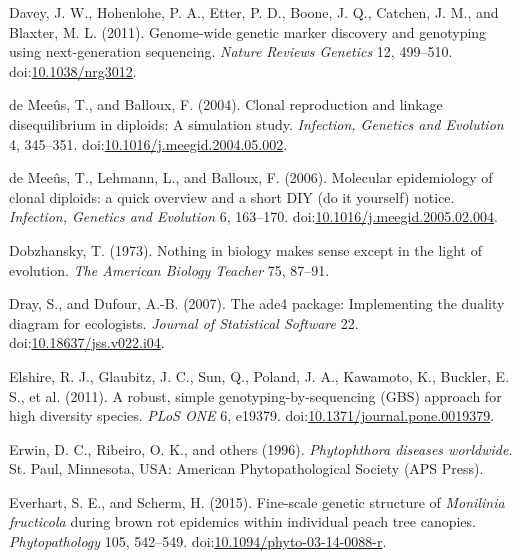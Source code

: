 \documentclass[double,12pt]{beavtex}
\begin{document}
  \hypertarget{ref-davey2011genome}{}
  Davey, J. W., Hohenlohe, P. A., Etter, P. D., Boone, J. Q., Catchen, J.
  M., and Blaxter, M. L. (2011). Genome-wide genetic marker discovery and
  genotyping using next-generation sequencing. \emph{Nature Reviews
  Genetics} 12, 499--510.
  doi:\href{https://doi.org/10.1038/nrg3012}{10.1038/nrg3012}.
  
  \hypertarget{ref-de2004clonal}{}
  de Meeûs, T., and Balloux, F. (2004). Clonal reproduction and linkage
  disequilibrium in diploids: A simulation study. \emph{Infection,
  Genetics and Evolution} 4, 345--351.
  doi:\href{https://doi.org/10.1016/j.meegid.2004.05.002}{10.1016/j.meegid.2004.05.002}.
  
  \hypertarget{ref-de2006molecular}{}
  de Meeûs, T., Lehmann, L., and Balloux, F. (2006). Molecular
  epidemiology of clonal diploids: a quick overview and a short DIY (do it
  yourself) notice. \emph{Infection, Genetics and Evolution} 6, 163--170.
  doi:\href{https://doi.org/10.1016/j.meegid.2005.02.004}{10.1016/j.meegid.2005.02.004}.
  
  \hypertarget{ref-dobzhansky2013nothing}{}
  Dobzhansky, T. (1973). Nothing in biology makes sense except in the
  light of evolution. \emph{The American Biology Teacher} 75, 87--91.
  
  \hypertarget{ref-dray2007ade4}{}
  Dray, S., and Dufour, A.-B. (2007). The ade4 package: Implementing the
  duality diagram for ecologists. \emph{Journal of Statistical Software}
  22.
  doi:\href{https://doi.org/10.18637/jss.v022.i04}{10.18637/jss.v022.i04}.
  
  \hypertarget{ref-elshire2011robust}{}
  Elshire, R. J., Glaubitz, J. C., Sun, Q., Poland, J. A., Kawamoto, K.,
  Buckler, E. S., et al. (2011). A robust, simple genotyping-by-sequencing
  (GBS) approach for high diversity species. \emph{PLoS ONE} 6, e19379.
  doi:\href{https://doi.org/10.1371/journal.pone.0019379}{10.1371/journal.pone.0019379}.
  
  \hypertarget{ref-erwin1996phytophthora}{}
  Erwin, D. C., Ribeiro, O. K., and others (1996). \emph{Phytophthora
  diseases worldwide}. St. Paul, Minnesota, USA: American
  Phytopathological Society (APS Press).
  
  \hypertarget{ref-everhart2014fine}{}
  Everhart, S. E., and Scherm, H. (2015). Fine-scale genetic structure of
  \emph{Monilinia fructicola} during brown rot epidemics within individual
  peach tree canopies. \emph{Phytopathology} 105, 542--549.
  doi:\href{https://doi.org/10.1094/phyto-03-14-0088-r}{10.1094/phyto-03-14-0088-r}.
  
\end{document}
